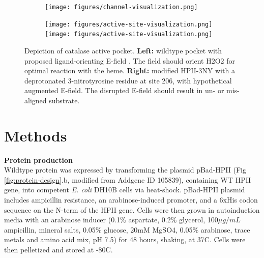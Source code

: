 \documentclass[journal=jacsat,manuscript=article]{achemso}
\begin{document}
\begin{figure}
  \begin{subfigure}{0.49\textwidth}
    \begin{minipage}{0.1\textwidth}\caption{}\end{minipage}%
    \begin{minipage}{.9\textwidth}
      \texttt{[image: figures/channel-visualization.png]}
    \end{minipage}
  \end{subfigure}
  \begin{subfigure}{0.5\textwidth}
    \begin{minipage}{0.1\textwidth}\caption{}\end{minipage}%
    \begin{minipage}{.9\textwidth}
      \texttt{[image: figures/active-site-visualization.png]}%
      \texttt{[image: figures/active-site-visualization.png]}%
    \end{minipage}
  \end{subfigure}
  \caption{Depiction of catalase active pocket. \textbf{Left:} wildtype pocket with proposed ligand-orienting E-field \cite{electricpotential}. The field should orient H2O2 for optimal reaction with the heme. \textbf{Right:} modified HPII-3NY with a deprotonated 3-nitrotyrosine residue at site 206, with hypothetical augmented E-field. The disrupted E-field should result in un- or mis-aligned substrate.}
  \label{fig:hypothesis}
\end{figure}

\section{Methods}
\textbf{Protein production}\\
Wildtype protein was expressed by transforming the plasmid pBad-HPII (Fig \ref{fig:protein-design}.b, modified from Addgene ID 105839), containing WT HPII gene, into competent \textit{E. coli} DH10B cells via heat-shock. pBad-HPII plasmid includes ampicillin resistance, an arabinose-induced promoter, and a 6xHis codon sequence on the N-term of the HPII gene. Cells were then grown in autoinduction media with an arabinose inducer (0.1\% aspartate, 0.2\% glycerol, 100$\mu g / mL$ ampicillin, mineral salts, 0.05\% glucose, 20mM MgSO4, 0.05\% arabinose, trace metals and amino acid mix, pH 7.5) for 48 hours, shaking, at 37\degree C. Cells were then pelletized and stored at -80\degree C.\\
\end{document}
